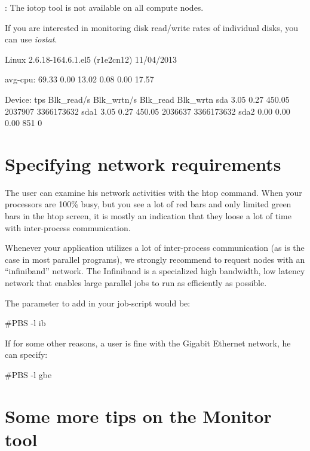 \begin{prompt}
\end{prompt}

: The iotop tool is not available on all compute nodes.

If you are interested in monitoring disk read/write rates of individual disks,
you can use \emph{iostat}.

\begin{prompt}
Linux 2.6.18-164.6.1.el5 (r1e2cn12)  11/04/2013

avg-cpu:  %
          69.33    0.00   13.02    0.08    0.00   17.57

Device:    tps   Blk_read/s   Blk_wrtn/s   Blk_read   Blk_wrtn
sda       3.05         0.27       450.05    2037907 3366173632
sda1      3.05         0.27       450.05    2036637 3366173632
sda2      0.00         0.00         0.00        851          0
\end{prompt}

\section{Specifying network requirements}

The user can examine his network activities with the htop command. When your
processors are 100\% busy, but you see a lot of red bars and only limited green
bars in the htop screen, it is mostly an indication that they loose a lot of
time with inter-process communication.

Whenever your application utilizes a lot of inter-process communication (as is
the case in most parallel programs), we strongly recommend to request nodes
with an ``infiniband'' network. The Infiniband is a specialized high bandwidth,
low latency network that enables large parallel jobs to run as efficiently as
possible.

The parameter to add in your job-script would be:
\begin{prompt}
#PBS -l ib
\end{prompt}

If for some other reasons, a user is fine with the Gigabit Ethernet network, he
can specify:

\begin{prompt}
#PBS -l gbe
\end{prompt}

\section{Some more tips on the Monitor tool}

